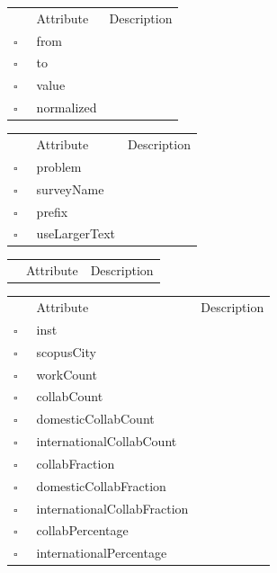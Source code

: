 \clearpage
\begin{table}
\caption{ReferenceFlow  }

\begin{longtable}{llp{8cm}}
& Attribute & Description \\
$\square$\ & from &  \\
$\square$\ & to &  \\
$\square$\ & value &  \\
$\square$\ & normalized &  \\
\end{longtable}
\label{attr:ReferenceFlow}
\end{table}

\begin{table}
\caption{Scenario  This class describes the dataset for the application. Typically there is a single instance of this class in the application at all times.}

\begin{longtable}{llp{8cm}}
& Attribute & Description \\
$\square$\ & problem &  \\
$\square$\ & surveyName &  \\
$\square$\ & prefix &  \\
$\square$\ & useLargerText &  \\
\end{longtable}
\label{attr:Scenario}
\end{table}

\begin{table}
\caption{School  }

\begin{longtable}{llp{8cm}}
& Attribute & Description \\
\end{longtable}
\label{attr:School}
\end{table}

\begin{table}
\caption{ScopusAffiliation  }

\begin{longtable}{llp{8cm}}
& Attribute & Description \\
$\square$\ & inst &  \\
$\square$\ & scopusCity &  \\
$\square$\ & workCount &  \\
$\square$\ & collabCount &  \\
$\square$\ & domesticCollabCount &  \\
$\square$\ & internationalCollabCount &  \\
$\square$\ & collabFraction &  \\
$\square$\ & domesticCollabFraction &  \\
$\square$\ & internationalCollabFraction &  \\
$\square$\ & collabPercentage &  \\
$\square$\ & internationalPercentage &  \\
\end{longtable}
\label{attr:ScopusAffiliation}
\end{table}

